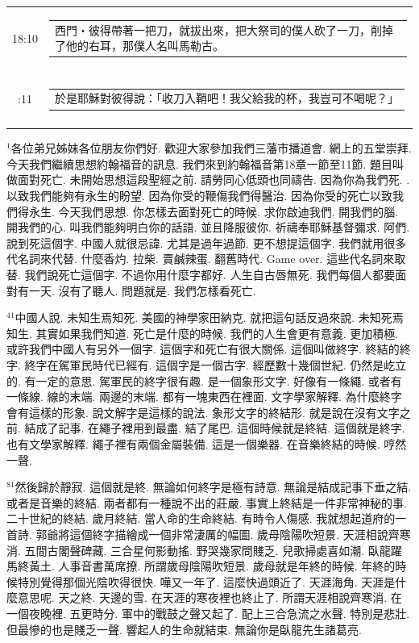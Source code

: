 \documentclass{book}
\begin{document}
\begin{longtable}{cl}
18:10 & \begin{tabularx}{0.7\textwidth}{X} 西門‧彼得帶著一把刀，就拔出來，把大祭司的僕人砍了一刀，削掉了他的右耳，那僕人名叫馬勒古。 \end{tabularx} \\ \\ \relax
18:11 & \begin{tabularx}{0.7\textwidth}{X} 於是耶穌對彼得說：「收刀入鞘吧！我父給我的杯，我豈可不喝呢？」 \end{tabularx} \\ \\
[1ex]
\hline
\hline
\end{longtable}
$^{1}$各位弟兄姊妹各位朋友你們好.
歡迎大家參加我們三藩市播道會.
網上的五堂崇拜.
今天我們繼續思想約翰福音的訊息.
我們來到約翰福音第18章一節至11節.
題目叫做面對死亡.
未開始思想這段聖經之前.
請勞同心低頭也同禱告.
因為你為我們死.
.
以致我們能夠有永生的盼望.
因為你受的鞭傷我們得醫治.
因為你受的死亡以致我們得永生.
今天我們思想.
你怎樣去面對死亡的時候.
求你啟迪我們.
開我們的腦.
開我們的心.
叫我們能夠明白你的話語.
並且降服彼你.
祈禱奉耶穌基督彌求.
阿們.
說到死這個字.
中國人就很忌諱.
尤其是過年過節.
更不想提這個字.
我們就用很多代名詞來代替.
什麼香灼.
拉柴.
賣鹹辣蛋.
翻舊時代.
Game over.
這些代名詞來取替.
我們說死亡這個字.
不過你用什麼字都好.
人生自古唇無死.
我們每個人都要面對有一天.
沒有了聽人.
問題就是.
我們怎樣看死亡.

$^{41}$中國人說.
未知生焉知死.
美國的神學家田納克.
就把這句話反過來說.
未知死焉知生.
其實如果我們知道.
死亡是什麼的時候.
我們的人生會更有意義.
更加積極.
或許我們中國人有另外一個字.
這個字和死亡有很大關係.
這個叫做終字.
終結的終字.
終字在駕軍民時代已經有.
這個字是一個古字.
經歷數十幾個世紀.
仍然是屹立的.
有一定的意思.
駕軍民的終字很有趣.
是一個象形文字.
好像有一條繩.
或者有一條線.
線的末端.
兩邊的末端.
都有一塊東西在裡面.
文字學家解釋.
為什麼終字會有這樣的形象.
說文解字是這樣的說法.
象形文字的終結形.
就是說在沒有文字之前.
結成了記事.
在繩子裡用到最盡.
結了尾巴.
這個時候就是終結.
這個就是終字.
也有文學家解釋.
繩子裡有兩個金屬裝備.
這是一個樂器.
在音樂終結的時候.
哼然一聲.

$^{81}$然後歸於靜寂.
這個就是終.
無論如何終字是極有詩意.
無論是結成記事下垂之結.
或者是音樂的終結.
兩者都有一種說不出的莊嚴.
事實上終結是一件非常神秘的事.
二十世紀的終結.
歲月終結.
當人命的生命終結.
有時令人傷感.
我就想起道府的一首詩.
郭爺將這個終字描繪成一個非常淒厲的幅圖.
歲母陰陽吹短景.
天涯相說齊寒消.
五間古閣聲碑藏.
三合星何影動搖.
野哭幾家問賤乏.
兒歌掃處喜如潮.
臥龍躍馬終黃土.
人事音書萬席撩.
所謂歲母陰陽吹短景.
歲母就是年終的時候.
年終的時候特別覺得那個光陰吹得很快.
嘩又一年了.
這麼快過頭近了.
天涯海角.
天涯是什麼意思呢.
天之終.
天邊的雪.
在天涯的寒夜裡也終止了.
所謂天涯相說齊寒消.
在一個夜晚裡.
五更時分.
軍中的戰鼓之聲又起了.
配上三合急流之水聲.
特別是悲壯.
但最慘的也是賤乏一聲.
響起人的生命就結束.
無論你是臥龍先生諸葛亮.
\end{document}
